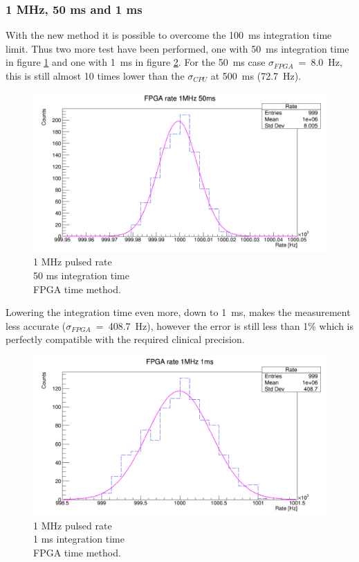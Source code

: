 \subsubsection{1 MHz, 50 ms and 1 ms}
\noindent With the new method it is possible to overcome the 100~ms integration time limit. Thus two more test have been performed, one with 50~ms integration time in figure \ref{fig:FPGA-time-rate-1MHz-50ms} and one with 1~ms in figure \ref{fig:FPGA-time-rate-1MHz-1ms}.
For the 50~ms case $\sigma_{FPGA}$~=~8.0~Hz, this is still almost 10 times lower than the $\sigma_{CPU}$ at 500~ms (72.7~Hz).   
\begin{figure}[H]
	\centering
	\includegraphics[width=0.95\linewidth]{IMG/ch5/RateMeasures/FPGA-time-rate-1MHz-50ms}
	\caption{1 MHz pulsed rate\\50 ms integration time\\FPGA time method.}
	\label{fig:FPGA-time-rate-1MHz-50ms}
\end{figure}
\noindent Lowering the integration time even more, down to 1~ms, makes the measurement less accurate ($\sigma_{FPGA}$~=~408.7~Hz), however the error is still less than 1\% which is perfectly compatible with the required clinical precision.
\begin{figure}[H]
	\centering
	\includegraphics[width=0.95\linewidth]{IMG/ch5/RateMeasures/FPGA-time-rate-1MHz-1ms}
	\caption{1 MHz pulsed rate\\1 ms integration time\\FPGA time method.}
	\label{fig:FPGA-time-rate-1MHz-1ms}
\end{figure}

